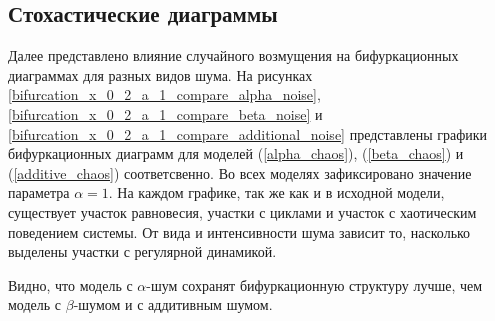 \subsection{Стохастические диаграммы}

    Далее представлено влияние случайного возмущения на бифуркационных диаграммах для разных видов шума. На рисунках \ref{bifurcation_x_0_2_a_1_compare_alpha_noise}, \ref{bifurcation_x_0_2_a_1_compare_beta_noise} и \ref{bifurcation_x_0_2_a_1_compare_additional_noise} представлены графики бифуркационных диаграмм для моделей (\ref{alpha_chaos}), (\ref{beta_chaos}) и (\ref{additive_chaos}) соответсвенно. Во всех моделях зафиксировано значение параметра \(\alpha = 1\). На каждом графике, так же как и в исходной модели, существует участок равновесия, участки с циклами и участок с хаотическим поведением системы. От вида и интенсивности шума зависит то, насколько выделены участки с регулярной динамикой.

    Видно, что модель с \(\alpha\)-шум сохранят бифуркационную структуру лучше, чем модель с \(\beta\)-шумом и с аддитивным шумом.


